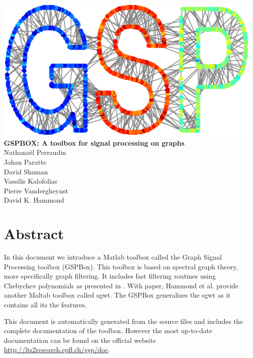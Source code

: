 \documentclass[a4paper]{book}
\begin{document}
\begin{titlepage}
\begin{center}
\includegraphics[width=70ex]{frontpage}
\\[0.4cm]
{ \huge \bfseries GSPBOX: A toolbox for signal processing on graphs}\\[0.4cm]
\large {Nathana{\"e}l Perraudin} \\
\large {Johan Paratte} \\
\large {David Shuman} \\
\large {Vassilis Kalofolias } \\ 
\large {Pierre Vandergheynst } \\ 
\large {David K. Hammond} \\


\end{center}

\end{titlepage}


\tableofcontents

\section*{Abstract}
In this document we introduce a Matlab toolbox called the Graph Signal Processing toolbox (GSPBox). This toolbox is based on spectral graph theory, more specifically graph filtering. It includes fast filtering routines using Chebychev polynomials as presented in \cite{hammond2011wavelets}. With paper, Hammond et al. provide another Maltab toolbox called sgwt. The GSPBox generalizes the sgwt as it contains all its the features.
 
This document is automatically generated from the source files and includes the complete documentation of the toolbox. However the most up-to-date documentation can be found on the official website \url{http://lts2research.epfl.ch/gsp/doc}. 














\end{document}
